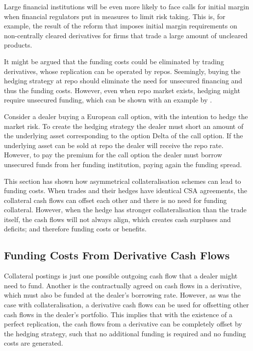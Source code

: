 \documentclass[main.tex]{subfiles}
\begin{document}
        Large financial institutions will be even more likely to face calls for initial margin
        when financial regulators put in measures to limit risk taking.
        This is, for example, the result of the reform \textcite{BCBC2020}
        that imposes initial margin requirements on non-centrally cleared derivatives for 
        firms that trade a large amount of uncleared products.

        It might be argued that the funding costs could be eliminated by trading derivatives,
        whose replication can be operated by repos. 
        Seemingly, buying the hedging strategy at repo should eliminate the need for unsecured financing
        and thus the funding costs. 
        However, even when repo market exists, hedging might require unsecured funding,
        which can be shown with an example by \textcite{Castagna2012FVA}.

        \begin{example}
        Consider a dealer buying a European call option, with the intention to hedge the market risk.
        To create the hedging strategy the dealer must short an amount of the underlying asset corresponding to the option Delta of the call option.
        If the underlying asset can be sold at repo the dealer will receive the repo rate.
        However, to pay the premium for the call option the dealer must borrow unsecured funds from her funding institution,
        paying again the funding spread. 
        \end{example}

        This section has shown how asymmetrical collateralisation schemes
        can lead to funding costs. 
        When trades and their hedges have identical CSA agreements, 
        the collateral cash flows can offset each other and there is no need for funding collateral.
        However, when the hedge has stronger collateralisation than the trade itself,
        the cash flows will not always align, which creates cash surpluses and deficits;
        and therefore funding costs or benefits.
        
    \subsection{Funding Costs From Derivative Cash Flows}
        Collateral postings is just one possible outgoing cash flow that a dealer might need to fund.
        Another is the contractually agreed on cash flows in a derivative,
        which must also be funded at the dealer's borrowing rate.
        However, as was the case with collateralisation,
        a derivative cash flows can be used for offsetting 
        other cash flows in the dealer's portfolio.
        This implies that with the existence of a perfect replication,
        the cash flows from a derivative can be completely offset by the hedging strategy,
        such that no additional funding is required and no funding costs are generated.
\end{document}
